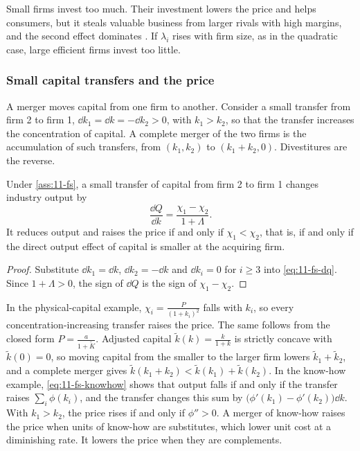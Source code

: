 Small firms invest too much. Their investment lowers the price and helps consumers, but it steals valuable
business from larger rivals with high margins, and the second effect dominates \citep[pp.~10--11]{FarrellShapiro1988}.
If $\lambda_i$ rises with firm size, as in the quadratic case, large efficient firms invest too little.

\subsubsection{Small capital transfers and the price}

A merger moves capital from one firm to another. Consider a small transfer from firm 2 to firm 1,
$\dd k_1 = \dd k = -\dd k_2 > 0$, with $k_1 > k_2$, so that the transfer increases the concentration of capital.
A complete merger of the two firms is the accumulation of such transfers, from $(k_1, k_2)$ to $(k_1 + k_2, 0)$.
Divestitures are the reverse.

\begin{proposition}\label{prop:11-fs-price}
Under \cref{ass:11-fs}, a small transfer of capital from firm 2 to firm 1 changes industry output by
\begin{equation}\label{eq:11-fs-dqdk}
\frac{\dd Q}{\dd k} = \frac{\chi_1 - \chi_2}{1 + \Lambda}.
\end{equation}
It reduces output and raises the price if and only if $\chi_1 < \chi_2$, that is, if and only if the direct
output effect of capital is smaller at the acquiring firm.
\end{proposition}

\begin{proof}
Substitute $\dd k_1 = \dd k$, $\dd k_2 = -\dd k$ and $\dd k_i = 0$ for $i \ge 3$ into \eqref{eq:11-fs-dq}. Since
$1 + \Lambda > 0$, the sign of $\dd Q$ is the sign of $\chi_1 - \chi_2$.
\end{proof}

In the physical-capital example, $\chi_i = \frac{P}{(1 + k_i)^2}$ falls with $k_i$, so every
concentration-increasing transfer raises the price. The same follows from the closed form $P = \frac{a}{1 + \tilde
K}$. Adjusted capital $\tilde k(k) = \frac{k}{1 + k}$ is strictly concave with $\tilde k(0) = 0$, so moving capital
from the smaller to the larger firm lowers $\tilde k_1 + \tilde k_2$, and a complete merger gives
$\tilde k(k_1 + k_2) < \tilde k(k_1) + \tilde k(k_2)$. In the know-how example, \eqref{eq:11-fs-knowhow} shows
that output falls if and only if the transfer raises $\sum_i\phi(k_i)$, and the transfer changes this sum by
$\big(\phi'(k_1) - \phi'(k_2)\big)\dd k$. With $k_1 > k_2$, the price rises if and only if $\phi'' > 0$. A merger of
know-how raises the price when units of know-how are substitutes, which lower unit cost at a diminishing rate. It
lowers the price when they are complements.

